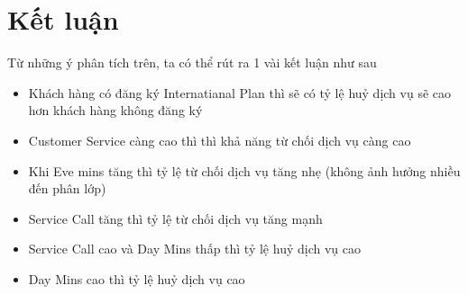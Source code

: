 \documentclass[a4paper, 12pt]{article}
\begin{document}
\section{Kết luận}
Từ những ý phân tích trên, ta có thể rút ra 1 vài kết luận như sau
\begin{itemize}
    \item Khách hàng có đăng ký Internatianal Plan thì sẽ có tỷ lệ huỷ dịch vụ sẽ cao hơn khách hàng không đăng ký
    \item Customer Service càng cao thì thì khả năng từ chối dịch vụ càng cao
    \item Khi Eve mins tăng thì tỷ lệ từ chối dịch vụ tăng nhẹ (không ảnh hưởng nhiều đến phân lớp)
    \item Service Call tăng thì tỷ lệ từ chối dịch vụ tăng mạnh
    \item Service Call cao và Day Mins thấp thì tỷ lệ huỷ dịch vụ cao 
    \item Day Mins cao thì tỷ lệ huỷ dịch vụ cao 
\end{itemize}
\end{document}
